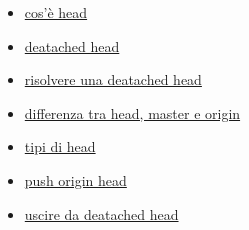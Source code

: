 \documentclass{article} \usepackage[textwidth=19cm,textheight=24cm]{geometry}
\begin{document}
\begin{itemize}
    \item \href{https://stackoverflow.com/questions/2304087/what-is-head-in-git}
        {cos'è head}
    \item \href{https://www.git-tower.com/learn/git/faq/detached-head-when-checkout-commit}
        {deatached head}
    \item \href{https://stackoverflow.com/questions/34519665/how-can-i-move-head-back-to-a-previous-location-detached-head-undo-commits}
        {risolvere una deatached head}
    \item \href{https://stackoverflow.com/questions/8196544/what-are-the-git-concepts-of-head-master-origin}
        {differenza tra head, master e origin}
    \item \href{https://stackoverflow.com/questions/20954566/what-is-the-difference-from-head-head-and-head1}
        {tipi di head}
    \item \href{https://stackoverflow.com/questions/23241052/what-does-git-push-origin-head-mean}
        {push origin head}
    \item \href{https://stackoverflow.com/questions/10228760/fix-a-git-detached-head}
        {uscire da deatached head}
\end{itemize}
\end{document}
